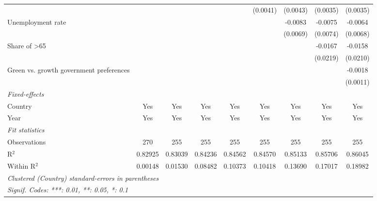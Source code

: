 \begin{table}[htbp]
\begin{tabular}{lcccccccc}
                                                                  &          &          &          &               & (0.0041)      & (0.0043)      & (0.0035)       & (0.0035)\\   
      Unemployment rate                                           &          &          &          &               &               & -0.0083       & -0.0075        & -0.0064\\   
                                                                  &          &          &          &               &               & (0.0069)      & (0.0074)       & (0.0068)\\   
      Share of >65                                                &          &          &          &               &               &               & -0.0167        & -0.0158\\   
                                                                  &          &          &          &               &               &               & (0.0219)       & (0.0210)\\   
      Green vs. growth government preferences                     &          &          &          &               &               &               &                & -0.0018\\   
                                                                  &          &          &          &               &               &               &                & (0.0011)\\   
      \midrule
      \emph{Fixed-effects}\\
      Country                                                     & Yes      & Yes      & Yes      & Yes           & Yes           & Yes           & Yes            & Yes\\  
      Year                                                        & Yes      & Yes      & Yes      & Yes           & Yes           & Yes           & Yes            & Yes\\  
      \midrule
      \emph{Fit statistics}\\
      Observations                                                & 270      & 255      & 255      & 255           & 255           & 255           & 255            & 255\\  
      R$^2$                                                       & 0.82925  & 0.83039  & 0.84236  & 0.84562       & 0.84570       & 0.85133       & 0.85706        & 0.86045\\  
      Within R$^2$                                                & 0.00148  & 0.01530  & 0.08482  & 0.10373       & 0.10418       & 0.13690       & 0.17017        & 0.18982\\  
      \midrule \midrule
      \multicolumn{9}{l}{\emph{Clustered (Country) standard-errors in parentheses}}\\
      \multicolumn{9}{l}{\emph{Signif. Codes: ***: 0.01, **: 0.05, *: 0.1}}\\
   \end{tabular}
\end{table}


